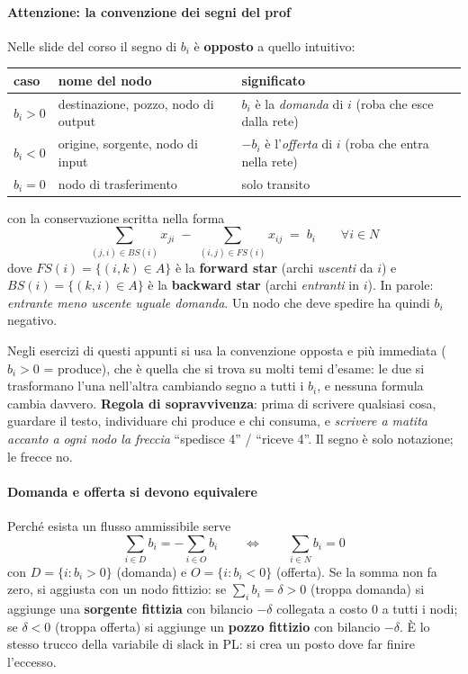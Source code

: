 \documentclass[12pt]{extarticle} %
\begin{document}
\paragraph{Attenzione: la convenzione dei segni del prof}
Nelle slide del corso il segno di $b_i$ è \textbf{opposto} a quello intuitivo:
\begin{center}
\begin{tabular}{lll}
\hline
\textbf{caso} & \textbf{nome del nodo} & \textbf{significato} \\
\hline
$b_i > 0$ & destinazione, pozzo, nodo di output & $b_i$ è la \emph{domanda} di $i$ (roba che esce dalla rete) \\
$b_i < 0$ & origine, sorgente, nodo di input & $-b_i$ è l'\emph{offerta} di $i$ (roba che entra nella rete) \\
$b_i = 0$ & nodo di trasferimento & solo transito \\
\hline
\end{tabular}
\end{center}
con la conservazione scritta nella forma
\[
\sum_{(j,i) \in BS(i)} x_{ji} \;-\; \sum_{(i,j) \in FS(i)} x_{ij} \;=\; b_i \qquad \forall i \in N
\]
dove $FS(i) = \{(i,k) \in A\}$ è la \textbf{forward star} (archi \emph{uscenti} da $i$) e $BS(i) = \{(k,i) \in A\}$ è la \textbf{backward star} (archi \emph{entranti} in $i$). In parole: \emph{entrante meno uscente uguale domanda}. Un nodo che deve spedire ha quindi $b_i$ negativo.

\noindent Negli esercizi di questi appunti si usa la convenzione opposta e più immediata ($b_i>0$ = produce), che è quella che si trova su molti temi d'esame: le due si trasformano l'una nell'altra cambiando segno a tutti i $b_i$, e nessuna formula cambia davvero. \textbf{Regola di sopravvivenza}: prima di scrivere qualsiasi cosa, guardare il testo, individuare chi produce e chi consuma, e \emph{scrivere a matita accanto a ogni nodo la freccia} ``spedisce 4'' / ``riceve 4''. Il segno è solo notazione; le frecce no.

\paragraph{Domanda e offerta si devono equivalere}
Perché esista un flusso ammissibile serve
\[
\sum_{i \in D} b_i = -\sum_{i \in O} b_i \qquad\Longleftrightarrow\qquad \sum_{i \in N} b_i = 0
\]
con $D = \{i : b_i > 0\}$ (domanda) e $O = \{i : b_i < 0\}$ (offerta). Se la somma non fa zero, si aggiusta con un nodo fittizio: se $\sum_i b_i = \delta > 0$ (troppa domanda) si aggiunge una \textbf{sorgente fittizia} con bilancio $-\delta$ collegata a costo 0 a tutti i nodi; se $\delta < 0$ (troppa offerta) si aggiunge un \textbf{pozzo fittizio} con bilancio $-\delta$. È lo stesso trucco della variabile di slack in PL: si crea un posto dove far finire l'eccesso.
\end{document}
